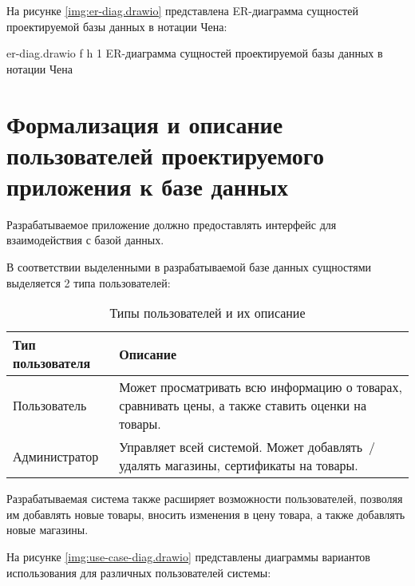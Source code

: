 \clearpage

На рисунке \ref{img:er-diag.drawio} представлена ER-диаграмма сущностей проектируемой базы данных в нотации Чена:

{er-diag.drawio} %
{f} %
{h} %
{1\textwidth} %
{ER-диаграмма сущностей проектируемой базы данных в нотации Чена} %

\clearpage

\section{Формализация и описание пользователей проектируемого приложения к базе данных}

Разрабатываемое приложение должно предоставлять интерфейс для взаимодействия с базой данных. 

В соответствии выделенными в разрабатываемой базе данных сущностями выделяется 2 типа пользователей:

\begin{table}[ht]
	\begin{center}
		\begin{threeparttable}
			\caption{Типы пользователей и их описание}
			\label{tbl:db_roles}
			\begin{tabular}{|p{4.5cm}|p{10cm}|}
					\hline
					\textbf{Тип пользователя} & \textbf{Описание} \\ \hline
					Пользователь & Может просматривать всю информацию о товарах, сравнивать цены, а также ставить оценки на товары. \\
					\hline
					Администратор & Управляет всей системой. Может добавлять~/удалять магазины, сертификаты на товары. \\ 
					\hline
				\end{tabular}
		\end{threeparttable}
	\end{center}
\end{table}

Разрабатываемая система также расширяет возможности пользователей, позволяя им добавлять новые товары, вносить изменения в цену товара, а также добавлять новые магазины.

На рисунке \ref{img:use-case-diag.drawio} представлены диаграммы вариантов использования для различных пользователей системы:

\clearpage

